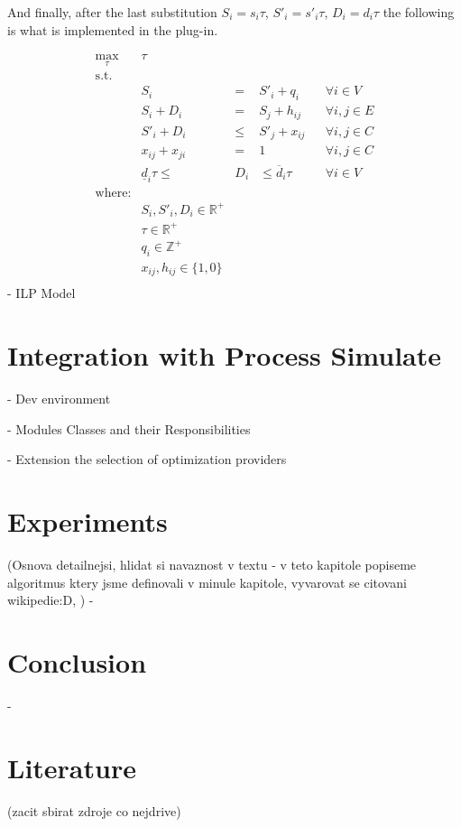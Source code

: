 \documentclass[11pt,twoside,a4paper]{book}
\begin{document}
And finally, after the last substitution $ S_i = s_i \tau $, $ S'_i = s'_i \tau $, $ D_i = d_i \tau $ the following is what is implemented in the plug-in.

\begin{equation}
\begin{matrix}
\displaystyle \max_\tau & \tau  \\
\textrm{s.t.} \\
& S_i & = & S'_i + q_i & & \forall i \in V \\
& S_i + D_i & = & S_j + h_{ij} & & \forall i, j \in E \\
& S'_i + D_i & \leq & S'_j + x_{ij} & & \forall i, j \in C \\
& x_{ij} + x_{ji} & = & 1 & & \forall i, j \in C \\
& \underline{d}_i \tau \leq &  D_i & \leq \overline{d}_i \tau & & \forall i \in V \\

\textrm{where:} \\
& S_i, S'_i, D_i \in \mathbb{R}^+\\
& \tau \in \mathbb{R}^+ \\
& q_i \in \mathbb{Z}^+\\
& x_{ij}, h_{ij} \in \{1, 0\} \\

\end{matrix}
\end{equation}
- ILP Model


\section{Integration with Process Simulate}
- Dev environment

- Modules Classes and their Responsibilities

- Extension the selection of optimization providers

\section{Experiments}
(Osnova detailnejsi, hlidat si navaznost v textu - v teto kapitole popiseme algoritmus ktery jsme definovali v minule kapitole, vyvarovat se citovani wikipedie:D, )
- 

\section{Conclusion}
- 

\section{Literature}
(zacit sbirat zdroje co nejdrive)




\printbibliography
\appendix





\end{document}
